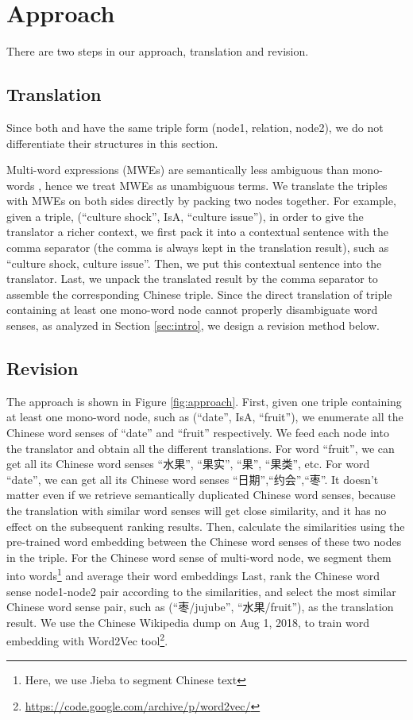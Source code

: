 \section{ Approach}
\label{sec:approach}
There are two steps in our approach, translation and revision.

\subsection{Translation}
Since both \pro and \con have the same triple form (node1, relation, node2), we do not differentiate their structures in this section.

Multi-word expressions (MWEs) are semantically less ambiguous 
than mono-words \cite{finlayson2011detecting}, hence we treat MWEs as unambiguous terms.
We translate the triples with MWEs on both sides directly by 
packing two nodes together.
For example, given a triple, (``culture shock'', IsA, ``culture issue''), 
in order to give the translator a richer context, we first pack it into a 
contextual sentence with the comma separator (the comma is always kept in the translation result), such as ``culture shock, culture issue''.
Then, we put this contextual sentence into the translator.
Last, we unpack the translated result by the comma separator to assemble 
the corresponding Chinese triple.
Since the direct translation of triple containing at least one mono-word node 
cannot properly disambiguate word senses, as analyzed in Section \ref{sec:intro}, we design 
a revision method below.

\subsection{Revision}

The approach is shown in Figure \ref{fig:approach}. 
First, given one triple containing at least one mono-word node, such as (``date'', IsA, ``fruit''), 
we enumerate all the Chinese word senses of ``date'' and ``fruit'' respectively.
We feed each node into the translator
and obtain all the different translations.
For word ``fruit'', we can get all its Chinese word senses ``水果'', ``果实'', ``果'', ``果类'', etc. 
For word ``date'', we can get all its Chinese word senses ``日期'',``约会'',``枣''. 
It doesn't matter even if we retrieve semantically duplicated Chinese word senses,
because the translation with similar word senses will get close similarity, 
and it has no effect on the subsequent ranking results.
Then, calculate the similarities using the pre-trained word embedding between the Chinese word senses of these two nodes in the triple.
For the Chinese word sense of multi-word node, we segment them into words\footnote{Here, we use Jieba to segment Chinese text} and average their word embeddings
Last, rank the Chinese word sense node1-node2 pair according to the similarities,
and select the most similar Chinese word sense pair, such as (``枣/jujube'', ``水果/fruit''), as the translation result.
We use the Chinese Wikipedia dump on Aug 1, 2018, 
to train word embedding with Word2Vec tool\footnote{\url{https://code.google.com/archive/p/word2vec/}}.

